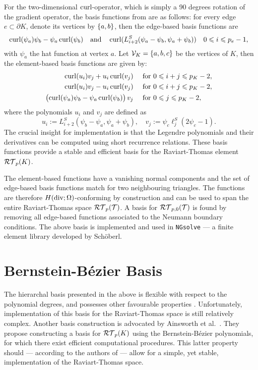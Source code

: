 \documentclass[thesis.tex]{subfiles}
\begin{document}
  For the two-dimensional $\operatorname{curl}$-operator, which is simply a 90 degrees rotation of the gradient operator, the basis functions from \cite{schoberl2005high} are as follows:
  for every edge $e \subset \partial K$, denote its vertices by $\set{a,b}$, then the edge-based basis functions are 
  \begin{align*}
    \operatorname{curl} (\psi_a) \psi_b - \psi_a \operatorname{curl} (\psi_b) \quad \text{and}\quad \operatorname{curl} (L^S_{i+2}(\psi_a - \psi_b, \psi_a + \psi_b)) \quad 0 \leqslant i \leqslant p_e - 1,
  \end{align*}
  with $\psi_a$ the hat function at vertex $a$. Let $\mathcal{V}_K = \set{a,b,c}$ be the vertices of $K$, then the element-based
  basis functions are given by:
  \begin{align*}
    \operatorname{curl} (u_i) v_j + u_i \operatorname{curl} (v_j) \quad &\text{ for } 0 \leqslant i +j \leqslant p_K -2,\\
    \operatorname{curl} (u_i) v_j - u_i \operatorname{curl} (v_j) \quad &\text{ for } 0 \leqslant i +j  \leqslant p_K - 2,\\
    \left(\operatorname{curl} (\psi_a) \psi_b - \psi_a \operatorname{curl} (\psi_b)\right)v_j\quad & \text{ for } 0 \leqslant j \leqslant p_K - 2,
  \end{align*}
  where the polynomials $u_i$ and $v_j$ are defined as
  \[
    u_i := L^S_{i+2}(\psi_b - \psi_a, \psi_a + \psi_b), \quad v_j := \psi_c \ell^S_j(2\psi_c - 1).
  \]
  The crucial insight for implementation is that the Legendre polynomials and their derivatives can be computed using short recurrence relations. These
  basis functions provide a stable and efficient basis for the Raviart-Thomas element $\mathcal{RT}_p(K)$.

  The element-based functions have a vanishing normal components and the set of edge-based basis functions
  match for two neighbouring triangles.
  The functions are therefore $H(\operatorname{div}; \Omega)$-conforming by construction and can be used to span
  the entire Raviart-Thomas space $\mathcal{RT}_p(\mathcal{T})$. A basis for $\mathcal{RT}_{p,0}(\mathcal{T})$ is found
  by removing all edge-based functions associated to the Neumann boundary conditions.
  The above basis is implemented and used in \texttt{NGsolve} \cite{ngsolve} --- a finite element library developed by Sch\"oberl.

  \section{Bernstein-B\'ezier Basis}
  The hierarchal basis presented in the above is flexible with respect to the polynomial degrees, and
  possesses other favourable properties \cite{schoberl2005high}. Unfortunately, implementation
  of this basis for the Raviart-Thomas space is still relatively complex. Another basis construction
  is advocated by Ainsworth et al.~\cite{ainsworthbernstein}.
  They propose constructing a basis for $\mathcal{RT}_p(K)$ using the Bernstein-B\'ezier polynomials, for which there exist efficient computational procedures. This latter
  property should --- according to the authors of \cite{ainsworthbernstein} --- allow for a simple, yet stable, implementation of the Raviart-Thomas space.
\end{document}
